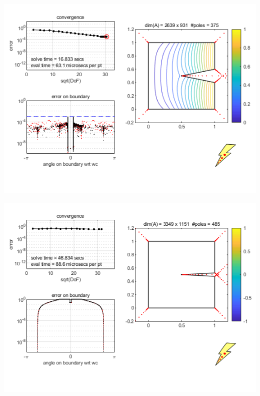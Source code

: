 \documentclass{seminar}
\begin{document}
\begin{slide}
\begin{center}
\includegraphics[scale=0.7]{./PNG/squarePacMan3}
\end{center}
\end{slide}
\begin{slide}
\begin{center}
\includegraphics[scale=0.7]{./PNG/squarePacMan4}
\end{center}
\end{slide} %
\end{document}
